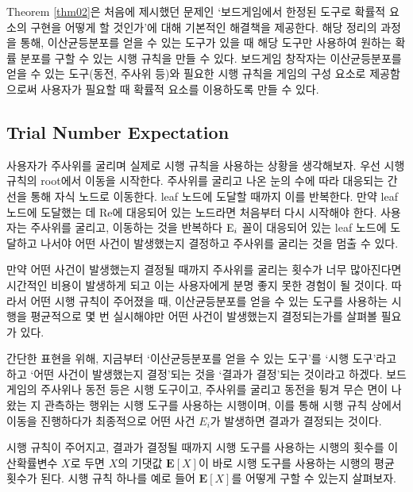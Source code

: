 \documentclass[11pt]{article}
\begin{document}
Theorem \ref{thm02}은 처음에 제시했던 문제인 `보드게임에서 한정된 도구로 확률적 요소의 구현을 어떻게 할 것인가'에 대해 기본적인 해결책을 제공한다. 해당 정리의 과정을 통해, 이산균등분포를 얻을 수 있는 도구가 있을 때 해당 도구만 사용하여 원하는 확률 분포를 구할 수 있는 시행 규칙을 만들 수 있다. 보드게임 창작자는 이산균등분포를 얻을 수 있는 도구(동전, 주사위 등)와 필요한 시행 규칙을 게임의 구성 요소로 제공함으로써 사용자가 필요할 때 확률적 요소를 이용하도록 만들 수 있다.

\subsection{Trial Number Expectation} \label{subsection3-3}
사용자가 주사위를 굴리며 실제로 시행 규칙을 사용하는 상황을 생각해보자. 우선 시행 규칙의 root에서 이동을 시작한다. 주사위를 굴리고 나온 눈의 수에 따라 대응되는 간선을 통해 자식 노드로 이동한다. leaf 노드에 도달할 때까지 이를 반복한다. 만약 leaf 노드에 도달했는 데 Re에 대응되어 있는 노드라면 처음부터 다시 시작해야 한다. 사용자는 주사위를 굴리고, 이동하는 것을 반복하다 $\textnormal{E}_{i}$ 꼴이 대응되어 있는 leaf 노드에 도달하고 나서야 어떤 사건이 발생했는지 결정하고 주사위를 굴리는 것을 멈출 수 있다. 

만약 어떤 사건이 발생했는지 결정될 때까지 주사위를 굴리는 횟수가 너무 많아진다면 시간적인 비용이 발생하게 되고 이는 사용자에게 분명 좋지 못한 경험이 될 것이다. 따라서 어떤 시행 규칙이 주어졌을 때, 이산균등분포를 얻을 수 있는 도구를 사용하는 시행을 평균적으로 몇 번 실시해야만 어떤 사건이 발생했는지 결정되는가를 살펴볼 필요가 있다.

간단한 표현을 위해, 지금부터 `이산균등분포를 얻을 수 있는 도구'를 `시행 도구'라고 하고 `어떤 사건이 발생했는지 결정'되는 것을 `결과가 결정'되는 것이라고 하겠다. 보드게임의 주사위나 동전 등은 시행 도구이고, 주사위를 굴리고 동전을 튕겨 무슨 면이 나왔는 지 관측하는 행위는 시행 도구를 사용하는 시행이며, 이를 통해 시행 규칙 상에서 이동을 진행하다가 최종적으로 어떤 사건 $E_{i}$가 발생하면 결과가 결정되는 것이다.

시행 규칙이 주어지고, 결과가 결정될 때까지 시행 도구를 사용하는 시행의 횟수를 이산확률변수 $X$로 두면 $X$의 기댓값 $\textbf{E}[X]$이 바로 시행 도구를 사용하는 시행의 평균 횟수가 된다. 시행 규칙 하나를 예로 들어 $\textbf{E}[X]$를 어떻게 구할 수 있는지 살펴보자.
\end{document}
